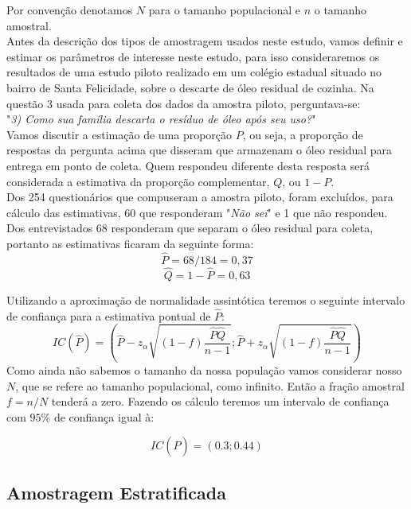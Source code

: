 \documentclass[12pt]{article}\usepackage[]{graphicx}\usepackage[]{color}
\begin{document}
Por convenção denotamos $N$ para o tamanho populacional e $n$ o tamanho
amostral.\\
\indent
Antes da descrição dos tipos de amostragem usados neste estudo, vamos definir
e estimar os parâmetros de interesse neste estudo, para isso consideraremos
os resultados de uma estudo piloto realizado em um colégio estadual situado
no bairro de Santa Felicidade, sobre o descarte de óleo residual de cozinha.
Na questão $3$ usada para coleta dos dados da amostra piloto, perguntava-se:\\
"\textit{3)  Como sua família descarta o resíduo de óleo após seu uso?}"\\
\indent
Vamos discutir a estimação de uma proporção $P$, ou seja, a proporção de respostas 
da pergunta acima que disseram que armazenam o óleo residual para entrega em ponto 
de coleta. Quem respondeu diferente desta resposta será considerada a
estimativa da proporção complementar, $Q$, ou $1-P$.\\
\indent
Dos 254 questionários que compuseram a amostra piloto, foram excluídos, para
cálculo das estimativas, 60 que responderam "\textit{Não sei}" e 1 que
não respondeu. Dos entrevistados $68$ responderam que separam o óleo
residual para coleta, portanto as estimativas ficaram da seguinte forma:\\

 $$ \hat{P} = 68/184 = 0,37 $$
 $$ \hat{Q} = 1-\hat{P} = 0,63 $$

Utilizando a aproximação de normalidade assintótica teremos o seguinte
intervalo de confiança para a estimativa pontual de $\hat{P}$:\\

\begin{equation}
   IC(\hat{P}) = \left( \hat{P}-z_\alpha \sqrt{(1-f)\frac{\hat{P} \hat{Q}}{n-1}}; \hat{P}+z_\alpha \sqrt{(1-f)\frac{\hat{P} \hat{Q}}{n-1}} \right)
\end{equation}
 Como ainda não sabemos o tamanho da nossa população vamos considerar nosso
 $N$, que se refere ao tamanho populacional, como infinito. Então a fração amostral $f=n/N$
 tenderá a zero. Fazendo os cálculo teremos um intervalo de confiança com
 $95\%$ de confiança igual à:

\indent


$$
IC(\hat{P}) = ( 0.3; 0.44)
$$


\subsection{Amostragem Estratificada}
\indent
\end{document}
